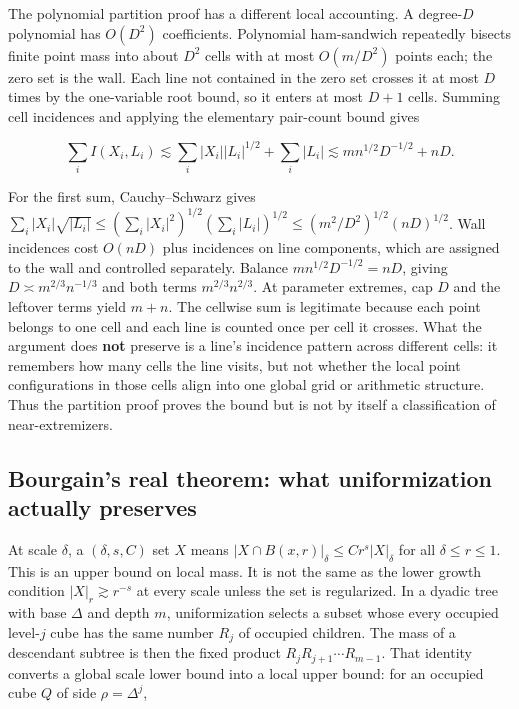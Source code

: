 The polynomial partition proof has a different local accounting. A degree-\(D\) polynomial has \(O(D^2)\) coefficients. Polynomial ham-sandwich repeatedly bisects finite point mass into about \(D^2\) cells with at most \(O(m/D^2)\) points each; the zero set is the wall. Each line not contained in the zero set crosses it at most \(D\) times by the one-variable root bound, so it enters at most \(D+1\) cells. Summing cell incidences and applying the elementary pair-count bound gives

\[\sum_i I(X_i,L_i)\lesssim \sum_i |X_i||L_i|^{1/2}+\sum_i|L_i|\lesssim m n^{1/2}D^{-1/2}+nD.\]

For the first sum, Cauchy--Schwarz gives \(\sum_i|X_i|\sqrt{|L_i|}\le(\sum_i|X_i|^2)^{1/2}(\sum_i|L_i|)^{1/2}\le(m^2/D^2)^{1/2}(nD)^{1/2}\). Wall incidences cost \(O(nD)\) plus incidences on line components, which are assigned to the wall and controlled separately. Balance \(m n^{1/2}D^{-1/2}=nD\), giving \(D\asymp m^{2/3}n^{-1/3}\) and both terms \(m^{2/3}n^{2/3}\). At parameter extremes, cap \(D\) and the leftover terms yield \(m+n\). The cellwise sum is legitimate because each point belongs to one cell and each line is counted once per cell it crosses. What the argument does \textbf{not} preserve is a line's incidence pattern across different cells: it remembers how many cells the line visits, but not whether the local point configurations in those cells align into one global grid or arithmetic structure. Thus the partition proof proves the bound but is not by itself a classification of near-extremizers.

\subsection{Bourgain's real theorem: what uniformization actually preserves}\label{04-visual-computing-ii-ch033-bourgains-real-theorem-what-uniformization-actually-preserves}

At scale \(\delta\), a \((\delta,s,C)\) set \(X\) means \(|X\cap B(x,r)|_\delta\le Cr^s|X|_\delta\) for all \(\delta\le r\le1\). This is an upper bound on local mass. It is not the same as the lower growth condition \(|X|_r\gtrsim r^{-s}\) at every scale unless the set is regularized. In a dyadic tree with base \(\Delta\) and depth \(m\), uniformization selects a subset whose every occupied level-\(j\) cube has the same number \(R_j\) of occupied children. The mass of a descendant subtree is then the fixed product \(R_jR_{j+1}\cdots R_{m-1}\). That identity converts a global scale lower bound into a local upper bound: for an occupied cube \(Q\) of side \(\rho=\Delta^j\),

